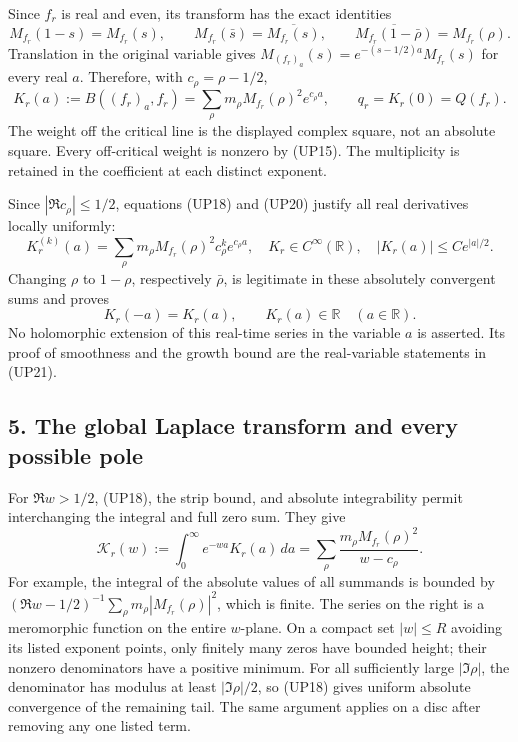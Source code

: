 \documentclass[
  10pt,
  a4paper,
]{article}
\begin{document}
Since \(f_r\) is real and even, its transform has the exact identities
\[
M_{f_r}(1-s)=M_{f_r}(s),\qquad
M_{f_r}(\bar s)=\overline{M_{f_r}(s)},\qquad
\overline{M_{f_r}(1-\bar\rho)}=M_{f_r}(\rho).
\tag{UP19}
\] Translation in the original variable gives
\(M_{(f_r)_a}(s)=e^{-(s-1/2)a}M_{f_r}(s)\) for every real \(a\).
Therefore, with \(c_\rho=\rho-1/2\), \[
K_r(a):=B((f_r)_a,f_r)
=\sum_\rho m_\rho M_{f_r}(\rho)^2e^{c_\rho a},
\qquad q_r=K_r(0)=Q(f_r).
\tag{UP20}
\] The weight off the critical line is the displayed complex square, not
an absolute square. Every off-critical weight is nonzero by (UP15). The
multiplicity is retained in the coefficient at each distinct exponent.

Since \(|\Re c_\rho|\le1/2\), equations (UP18) and (UP20) justify all
real derivatives locally uniformly: \[
K_r^{(k)}(a)=\sum_\rho m_\rho M_{f_r}(\rho)^2c_\rho^k e^{c_\rho a},
\quad K_r\in C^\infty(\mathbb R),\quad
|K_r(a)|\le C e^{|a|/2}.
\tag{UP21}
\] Changing \(\rho\) to \(1-\rho\), respectively \(\bar\rho\), is
legitimate in these absolutely convergent sums and proves \[
K_r(-a)=K_r(a),\qquad K_r(a)\in\mathbb R
\quad(a\in\mathbb R).
\tag{UP22}
\] No holomorphic extension of this real-time series in the variable
\(a\) is asserted. Its proof of smoothness and the growth bound are the
real-variable statements in (UP21).

\subsection{5. The global Laplace transform and every possible
pole}\label{the-global-laplace-transform-and-every-possible-pole}

For \(\Re w>1/2\), (UP18), the strip bound, and absolute integrability
permit interchanging the integral and full zero sum. They give \[
\mathscr K_r(w):=\int_0^\infty e^{-wa}K_r(a)\,da
=\sum_\rho\frac{m_\rho M_{f_r}(\rho)^2}{w-c_\rho}.
\tag{UP23}
\] For example, the integral of the absolute values of all summands is
bounded by \((\Re w-1/2)^{-1}\sum_\rho m_\rho|M_{f_r}(\rho)|^2\), which
is finite. The series on the right is a meromorphic function on the
entire \(w\)-plane. On a compact set \(|w|\le R\) avoiding its listed
exponent points, only finitely many zeros have bounded height; their
nonzero denominators have a positive minimum. For all sufficiently large
\(|\Im\rho|\), the denominator has modulus at least \(|\Im\rho|/2\), so
(UP18) gives uniform absolute convergence of the remaining tail. The
same argument applies on a disc after removing any one listed term.
\end{document}

